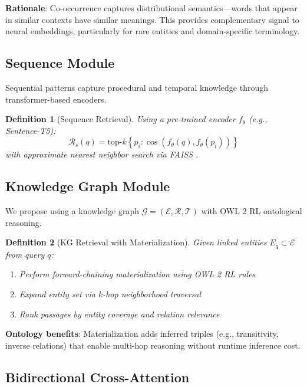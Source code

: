 \documentclass[10pt,twocolumn]{article}
\newtheorem{definition}{Definition}
\begin{document}
\textbf{Rationale}: Co-occurrence captures distributional semantics---words that appear in similar contexts have similar meanings. This provides complementary signal to neural embeddings, particularly for rare entities and domain-specific terminology.

\subsection{Sequence Module}

Sequential patterns capture procedural and temporal knowledge through transformer-based encoders.

\begin{definition}[Sequence Retrieval]
Using a pre-trained encoder $f_\theta$ (e.g., Sentence-T5):
\begin{equation}
\mathcal{R}_s(q) = \text{top-}k \left\{ p_i : \cos(f_\theta(q), f_\theta(p_i)) \right\}
\end{equation}
with approximate nearest neighbor search via FAISS \cite{johnson2019faiss}.
\end{definition}

\subsection{Knowledge Graph Module}
\label{sec:kg}

We propose using a knowledge graph $\mathcal{G} = (\mathcal{E}, \mathcal{R}, \mathcal{T})$ with OWL 2 RL ontological reasoning.

\begin{definition}[KG Retrieval with Materialization]
Given linked entities $E_q \subset \mathcal{E}$ from query $q$:
\begin{enumerate}
    \item Perform forward-chaining materialization using OWL 2 RL rules
    \item Expand entity set via $k$-hop neighborhood traversal
    \item Rank passages by entity coverage and relation relevance
\end{enumerate}
\end{definition}

\textbf{Ontology benefits}: Materialization adds inferred triples (e.g., transitivity, inverse relations) that enable multi-hop reasoning without runtime inference cost.

\subsection{Bidirectional Cross-Attention}
\label{sec:crossattn}
\end{document}
